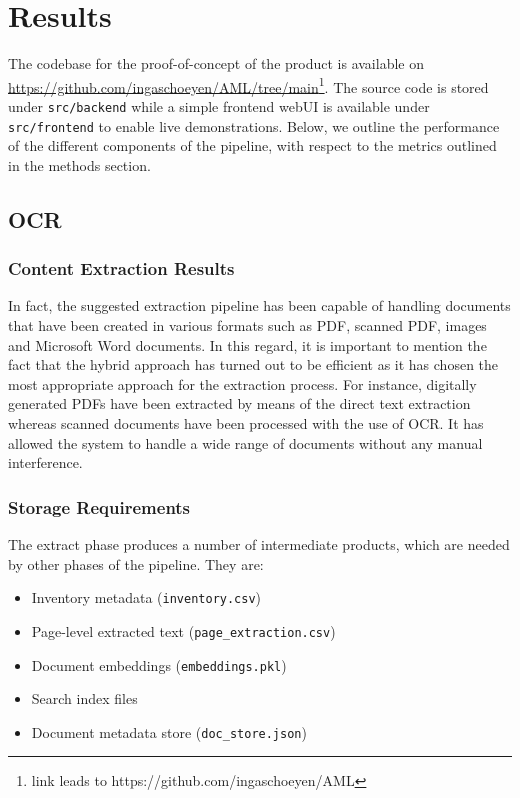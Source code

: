 \section{Results}
\label{sec:results}
The codebase for the proof-of-concept of the product is available on \hyperlink{github}{https://github.com/ingaschoeyen/AML/tree/main}\footnote{link leads to https://github.com/ingaschoeyen/AML}.
The source code is stored under \texttt{src/backend} while a simple frontend webUI is available under \texttt{src/frontend} to enable live demonstrations.
Below, we outline the performance of the different components of the pipeline, with respect to the metrics outlined in the methods section.


\subsection{OCR}
\subsubsection{Content Extraction Results}
In fact, the suggested extraction pipeline has been capable of handling documents that have been created in various formats such as PDF, scanned PDF, images and Microsoft Word documents. 
In this regard, it is important to mention the fact that the hybrid approach has turned out to be efficient as it has chosen the most appropriate approach for the extraction process. 
For instance, digitally generated PDFs have been extracted by means of the direct text extraction whereas scanned documents have been processed with the use of OCR. 
It has allowed the system to handle a wide range of documents without any manual interference.


\subsubsection{Storage Requirements}
The extract phase produces a number of intermediate products, which are needed by other phases of the pipeline. They are:
\begin{itemize}
    \item Inventory metadata (\texttt{inventory.csv})
    \item Page-level extracted text (\texttt{page\_extraction.csv})
    \item Document embeddings (\texttt{embeddings.pkl})
    \item Search index files
    \item Document metadata store (\texttt{doc\_store.json})
\end{itemize}

